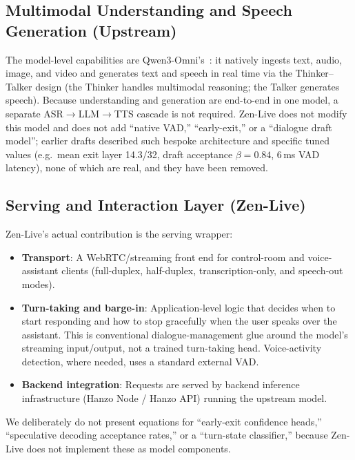 \documentclass[11pt,a4paper]{article}
\begin{document}
\subsection{Multimodal Understanding and Speech Generation (Upstream)}

The model-level capabilities are Qwen3-Omni's~\cite{qwen3omni}: it natively ingests
text, audio, image, and video and generates text and speech in real time via the
Thinker--Talker design (the Thinker handles multimodal reasoning; the Talker generates
speech). Because understanding and generation are end-to-end in one model, a separate
ASR$\to$LLM$\to$TTS cascade is not required. Zen-Live does not modify this model and
does not add ``native VAD,'' ``early-exit,'' or a ``dialogue draft model''; earlier
drafts described such bespoke architecture and specific tuned values (e.g.\ mean exit
layer 14.3/32, draft acceptance $\beta=0.84$, 6\,ms VAD latency), none of which are
real, and they have been removed.

\subsection{Serving and Interaction Layer (Zen-Live)}

Zen-Live's actual contribution is the serving wrapper:

\begin{itemize}
  \item \textbf{Transport}: A WebRTC/streaming front end for control-room and
        voice-assistant clients (full-duplex, half-duplex, transcription-only, and
        speech-out modes).
  \item \textbf{Turn-taking and barge-in}: Application-level logic that decides when to
        start responding and how to stop gracefully when the user speaks over the
        assistant. This is conventional dialogue-management glue around the model's
        streaming input/output, not a trained turn-taking head. Voice-activity
        detection, where needed, uses a standard external VAD.
  \item \textbf{Backend integration}: Requests are served by backend inference
        infrastructure (Hanzo Node / Hanzo API) running the upstream model.
\end{itemize}

We deliberately do not present equations for ``early-exit confidence heads,''
``speculative decoding acceptance rates,'' or a ``turn-state classifier,'' because
Zen-Live does not implement these as model components.
\end{document}
